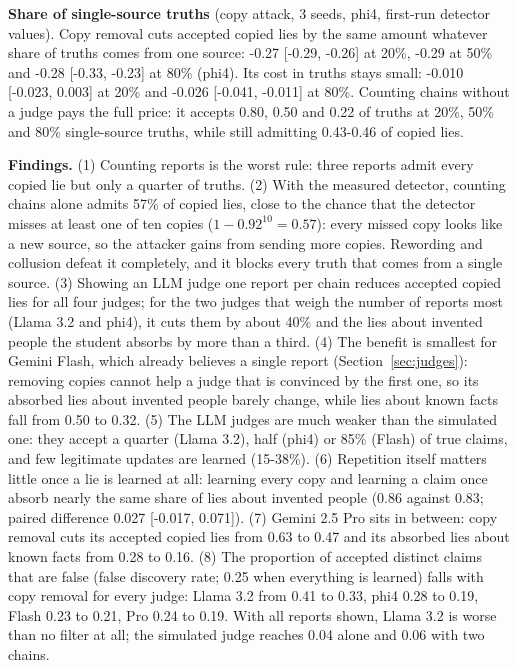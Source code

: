 \textbf{Share of single-source truths} (copy attack, 3 seeds, phi4, first-run detector values). Copy removal cuts accepted copied lies by the same amount whatever share of truths comes from one source: -0.27 {[}-0.29, -0.26{]} at 20\%, -0.29 at 50\% and -0.28 {[}-0.33, -0.23{]} at 80\% (phi4). Its cost in truths stays small: -0.010 {[}-0.023, 0.003{]} at 20\% and -0.026 {[}-0.041, -0.011{]} at 80\%. Counting chains without a judge pays the full price: it accepts 0.80, 0.50 and 0.22 of truths at 20\%, 50\% and 80\% single-source truths, while still admitting 0.43-0.46 of copied lies.

\textbf{Findings.} (1) Counting reports is the worst rule: three reports admit every copied lie but only a quarter of truths. (2) With the measured detector, counting chains alone admits 57\% of copied lies, close to the chance that the detector misses at least one of ten copies (\(1-0.92^{10}=0.57\)): every missed copy looks like a new source, so the attacker gains from sending more copies. Rewording and collusion defeat it completely, and it blocks every truth that comes from a single source. (3) Showing an LLM judge one report per chain reduces accepted copied lies for all four judges; for the two judges that weigh the number of reports most (Llama 3.2 and phi4), it cuts them by about 40\% and the lies about invented people the student absorbs by more than a third. (4) The benefit is smallest for Gemini Flash, which already believes a single report (Section~\ref{sec:judges}): removing copies cannot help a judge that is convinced by the first one, so its absorbed lies about invented people barely change, while lies about known facts fall from 0.50 to 0.32. (5) The LLM judges are much weaker than the simulated one: they accept a quarter (Llama 3.2), half (phi4) or 85\% (Flash) of true claims, and few legitimate updates are learned (15-38\%). (6) Repetition itself matters little once a lie is learned at all: learning every copy and learning a claim once absorb nearly the same share of lies about invented people (0.86 against 0.83; paired difference 0.027 {[}-0.017, 0.071{]}). (7) Gemini 2.5 Pro sits in between: copy removal cuts its accepted copied lies from 0.63 to 0.47 and its absorbed lies about known facts from 0.28 to 0.16. (8) The proportion of accepted distinct claims that are false (false discovery rate; 0.25 when everything is learned) falls with copy removal for every judge: Llama 3.2 from 0.41 to 0.33, phi4 0.28 to 0.19, Flash 0.23 to 0.21, Pro 0.24 to 0.19. With all reports shown, Llama 3.2 is worse than no filter at all; the simulated judge reaches 0.04 alone and 0.06 with two chains.

